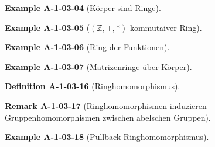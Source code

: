 \documentclass[10pt, letterpaper]{article}
\newcommand{\Z}{\mathbb{Z}}
\newcommand{\CustomHeading}[3]{%
  \par\medskip\noindent%
  \textbf{#1 #2} \textnormal{(#3)}.\enskip%
}
\newenvironment{DEF}[2]{\CustomHeading{Definition}{#1}{#2}}{}
\newenvironment{REM}[2]{\CustomHeading{Remark}{#1}{#2}}{}
\newenvironment{EXA}[2]{\CustomHeading{Example}{#1}{#2}}{}
\begin{document}

\begin{EXA}{A-1-03-04}{Körper sind Ringe}
\end{EXA}


\begin{EXA}{A-1-03-05}{$(\Z,+,*)$ kommutaiver Ring}
\end{EXA}


\begin{EXA}{A-1-03-06}{Ring der Funktionen}
\end{EXA}


\begin{EXA}{A-1-03-07}{Matrizenringe über Körper}
\end{EXA}


\begin{DEF}{A-1-03-16}{Ringhomomorphismus}
\end{DEF}


\begin{REM}{A-1-03-17}{Ringhomomorphismen induzieren Gruppenhomomorphismen zwischen abelschen Gruppen}
\end{REM}


\begin{EXA}{A-1-03-18}{Pullback-Ringhomomorphismus}
\end{EXA}

\end{document}
